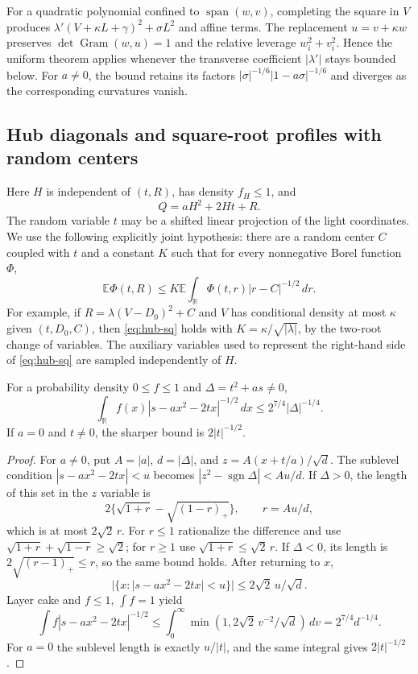 For a quadratic polynomial confined to $\operatorname{span}(w,v)$,
completing the square in $V$ produces
$\lambda'(V+\kappa L+\gamma)^2+\sigma L^2$ and affine terms.
The replacement $u=v+\kappa w$ preserves
$\det\operatorname{Gram}(w,u)=1$ and the relative leverage
$w_i^2+v_i^2$.  Hence the uniform theorem applies whenever the
transverse coefficient $|\lambda'|$ stays bounded below.
For $a\ne0$, the bound retains its factors
$|\sigma|^{-1/6}|1-a\sigma|^{-1/6}$ and diverges as the
corresponding curvatures vanish.

\subsection{Hub diagonals and square-root profiles with random centers}

Here $H$ is independent of $(t,R)$, has density $f_H\le1$, and
\[
 Q=aH^2+2Ht+R.
\]
The random variable $t$ may be a shifted linear projection of the
light coordinates.  We use the following explicitly joint
hypothesis: there are a random center $C$ coupled with $t$ and
a constant $K$ such that for every nonnegative Borel function
$\Phi$,
\begin{equation}\label{eq:hub-sq}
 \mathbb E\Phi(t,R)\le
 K\mathbb E\int_{\mathbb R}
                         \Phi(t,r)|r-C|^{-1/2}\,dr.
\end{equation}
For example, if
$R=\lambda(V-D_0)^2+C$ and $V$ has conditional density at most
$\kappa$ given $(t,D_0,C)$, then \eqref{eq:hub-sq} holds with
$K=\kappa/\sqrt{|\lambda|}$, by the two-root change of variables.
The auxiliary variables used to represent the right-hand side of
\eqref{eq:hub-sq} are sampled independently of $H$.

\begin{lemma}\label{lem:hub-sq-scalar}
For a probability density $0\le f\le1$ and
$\Delta=t^2+a s\ne0$,
\[
 \int_{\mathbb R}f(x)|s-ax^2-2tx|^{-1/2}\,dx
 \le2^{7/4}|\Delta|^{-1/4}.
\]
If $a=0$ and $t\ne0$, the sharper bound is $2|t|^{-1/2}$.
\end{lemma}

\begin{proof}
For $a\ne0$, put $A=|a|$, $d=|\Delta|$, and
$z=A(x+t/a)/\sqrt d$.
The sublevel condition $|s-ax^2-2tx|<u$ becomes
$|z^2-\operatorname{sgn}\Delta|<Au/d$.
If $\Delta>0$, the length of this set in the $z$ variable is
\[
 2\{\sqrt{1+r}-\sqrt{(1-r)_+}\},\qquad r=Au/d,
\]
which is at most $2\sqrt2\,r$.  For $r\le1$ rationalize
the difference and use
$\sqrt{1+r}+\sqrt{1-r}\ge\sqrt2$; for $r\ge1$ use
$\sqrt{1+r}\le\sqrt2\,r$.
If $\Delta<0$, its length is $2\sqrt{(r-1)_+}\le r$,
so the same bound holds.  After returning to $x$,
\[
 |\{x:|s-ax^2-2tx|<u\}|
                      \le 2\sqrt2\,u/\sqrt d.
\]
Layer cake and $f\le1$, $\int f=1$ yield
\[
 \int f|s-ax^2-2tx|^{-1/2}
 \le\int_0^\infty
       \min(1,2\sqrt2\,v^{-2}/\sqrt d)\,dv
 =2^{7/4}d^{-1/4}.
\]
For $a=0$ the sublevel length is exactly $u/|t|$,
and the same integral gives $2|t|^{-1/2}$.
\end{proof}

